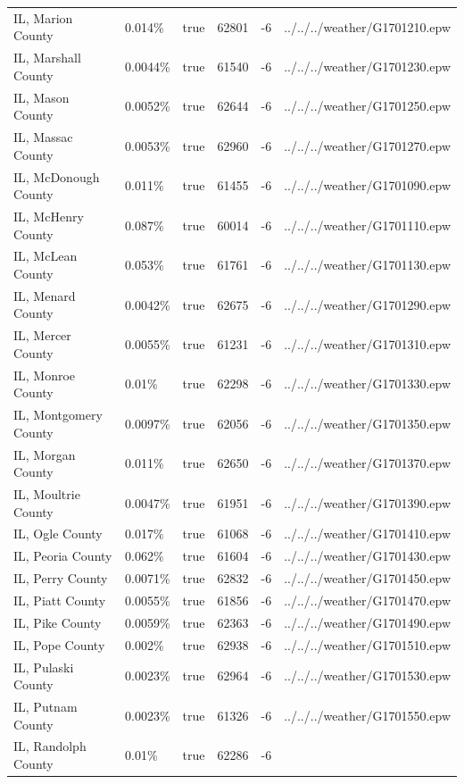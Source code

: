 \begin{longtable}[]{@{}llllll@{}}
IL, Marion County & 0.014\% & true & 62801 & -6 &
../../../weather/G1701210.epw \\
IL, Marshall County & 0.0044\% & true & 61540 & -6 &
../../../weather/G1701230.epw \\
IL, Mason County & 0.0052\% & true & 62644 & -6 &
../../../weather/G1701250.epw \\
IL, Massac County & 0.0053\% & true & 62960 & -6 &
../../../weather/G1701270.epw \\
IL, McDonough County & 0.011\% & true & 61455 & -6 &
../../../weather/G1701090.epw \\
IL, McHenry County & 0.087\% & true & 60014 & -6 &
../../../weather/G1701110.epw \\
IL, McLean County & 0.053\% & true & 61761 & -6 &
../../../weather/G1701130.epw \\
IL, Menard County & 0.0042\% & true & 62675 & -6 &
../../../weather/G1701290.epw \\
IL, Mercer County & 0.0055\% & true & 61231 & -6 &
../../../weather/G1701310.epw \\
IL, Monroe County & 0.01\% & true & 62298 & -6 &
../../../weather/G1701330.epw \\
IL, Montgomery County & 0.0097\% & true & 62056 & -6 &
../../../weather/G1701350.epw \\
IL, Morgan County & 0.011\% & true & 62650 & -6 &
../../../weather/G1701370.epw \\
IL, Moultrie County & 0.0047\% & true & 61951 & -6 &
../../../weather/G1701390.epw \\
IL, Ogle County & 0.017\% & true & 61068 & -6 &
../../../weather/G1701410.epw \\
IL, Peoria County & 0.062\% & true & 61604 & -6 &
../../../weather/G1701430.epw \\
IL, Perry County & 0.0071\% & true & 62832 & -6 &
../../../weather/G1701450.epw \\
IL, Piatt County & 0.0055\% & true & 61856 & -6 &
../../../weather/G1701470.epw \\
IL, Pike County & 0.0059\% & true & 62363 & -6 &
../../../weather/G1701490.epw \\
IL, Pope County & 0.002\% & true & 62938 & -6 &
../../../weather/G1701510.epw \\
IL, Pulaski County & 0.0023\% & true & 62964 & -6 &
../../../weather/G1701530.epw \\
IL, Putnam County & 0.0023\% & true & 61326 & -6 &
../../../weather/G1701550.epw \\
IL, Randolph County & 0.01\% & true & 62286 & -6 &

\end{longtable}

